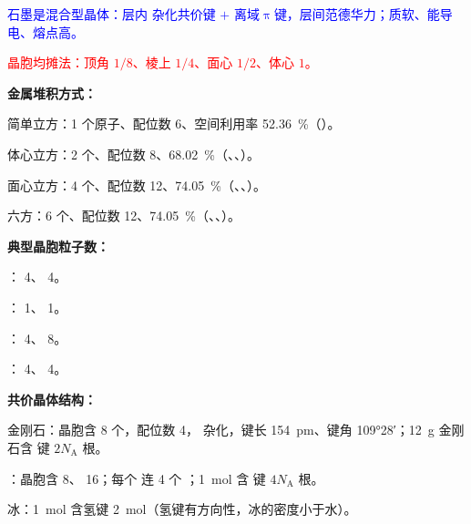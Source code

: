             \textcolor{blue}{石墨是混合型晶体：层内  杂化共价键 \(+\) 离域\(\uppi\)键，层间范德华力；质软、能导电、熔点高。}

            \textcolor{red}{晶胞均摊法：顶角 \(1/8\)、棱上 \(1/4\)、面心 \(1/2\)、体心 \(1\)。}

            \textbf{金属堆积方式：}
            \begin{datas}[leftmargin=*]
                \item 简单立方：1 个原子、配位数 6、空间利用率 \SI{52.36}{\percent}（）。
                \item 体心立方：2 个、配位数 8、\SI{68.02}{\percent}（、、）。
                \item 面心立方：4 个、配位数 12、\SI{74.05}{\percent}（、、）。
                \item 六方：6 个、配位数 12、\SI{74.05}{\percent}（、、）。
            \end{datas}
            \par\vspace{0.6em}
            \begin{minipage}[t]{0.47\textwidth}
                \textbf{典型晶胞粒子数：}
                \begin{datas}[leftmargin=*]
                    \item {}： 4、 4。
                    \item {}： 1、 1。
                    \item {}： 4、 8。
                    \item {}： 4、 4。
                \end{datas}
            \end{minipage}
            \hfill
            \begin{minipage}[t]{0.47\textwidth}
                \textbf{共价晶体结构：}
                \begin{datas}[leftmargin=*]
                    \item 金刚石：晶胞含  8 个，配位数 4， 杂化，键长 \SI{154}{\pm}、键角 \ang{109;28}；\SI{12}{\gram} 金刚石含  键 \(2N_\text{A}\) 根。
                    \item {}：晶胞含  8、 16；每个  连 4 个 ；\SI{1}{\mole}  含  键 \(4N_\text{A}\) 根。
                    \item 冰：\SI{1}{\mole}  含氢键 \SI{2}{\mole}（氢键有方向性，冰的密度小于水）。
                \end{datas}
            \end{minipage}
            \par\vspace{0.6em}

